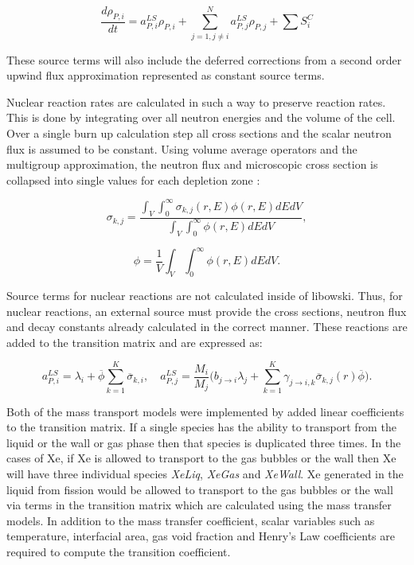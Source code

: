 \begin{equation}
    \frac{d \rho_{P,i}}{dt} = a_{P,i}^{LS}\rho_{P,i} + \sum_{j=1, j \neq i}^{N}a_{P,j}^{LS}\rho_{P, j} + \sum S^{C}_{i}
\end{equation}


\noindent These source terms will also include the deferred corrections from a second order upwind flux approximation represented as constant source terms. 

Nuclear reaction rates are calculated in such a way to preserve reaction rates. This is done by integrating over all neutron energies and the volume of the cell. Over a single burn up calculation step all cross sections and the scalar neutron flux is assumed to be constant. Using volume average operators and the multigroup approximation, the neutron flux and microscopic cross section is collapsed into single values for each depletion zone \cite{aarnoThesis}:

\begin{equation}
    \sigma_{k,j} = \frac{\int_{V}\int_{0}^{\infty}\sigma_{k,j}(r,E)\phi(r,E) dEdV}{\int_{V}\int_{0}^{\infty}\phi(r,E) dEdV},
\end{equation}

\begin{equation}
    \phi = \frac{1}{V}\int_{V}\int_{0}^{\infty}\phi(r,E)dEdV.
\end{equation}

\noindent Source terms for nuclear reactions are not calculated inside of libowski. Thus, for nuclear reactions, an external source must provide the cross sections, neutron flux and decay constants already calculated in the correct manner. These reactions are added to the transition matrix and are expressed as:

\begin{equation}
    a^{LS}_{P,i} = \lambda_{i} + \overline{\phi}\sum_{k=1}^{K} \overline{\sigma}_{k,i}, \quad 
    a^{LS}_{P,j} = \frac{M_{i}}{M_{j}}\bigg(b_{j\rightarrow i}\lambda_{j} +
    \sum_{k=1}^{K}\gamma_{j\rightarrow i,k}\overline{\sigma}_{k,j}(r)\overline{\phi} \bigg).
\end{equation}

Both of the mass transport models were implemented by added linear coefficients to the transition matrix. If a single species has the ability to transport from the liquid or the wall or gas phase then that species is duplicated three times. In the cases of Xe, if Xe is allowed to transport to the gas bubbles or the wall then Xe will have three individual species \textit{XeLiq}, \textit{XeGas} and \textit{XeWall}. Xe generated in the liquid from fission would be allowed to transport to the gas bubbles or the wall via terms in the transition matrix which are calculated using the mass transfer models. In addition to the mass transfer coefficient, scalar variables such as temperature, interfacial area, gas void fraction and Henry's Law coefficients are required to compute the transition coefficient. 

